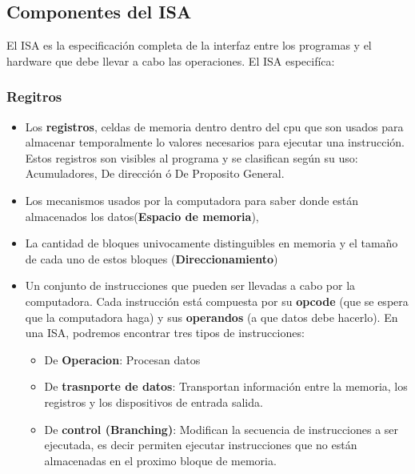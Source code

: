 \subsection{Componentes del ISA}
El ISA es la especificación completa de la interfaz entre los programas y el hardware que debe llevar a cabo las operaciones. El ISA especifíca:

\subsubsection{Regitros}
\begin{itemize}
	\item Los \textbf{registros},  celdas de memoria dentro dentro del cpu que son usados para almacenar temporalmente lo valores necesarios para ejecutar una instrucción. Estos registros son visibles al programa y se clasifican según su uso: Acumuladores, De dirección ó De Proposito General.
	\item Los mecanismos usados por la computadora para saber donde están almacenados los datos(\textbf{Espacio de memoria}), 
	\item La cantidad de bloques univocamente distinguibles en memoria y el tamaño de cada uno de estos bloques (\textbf{Direccionamiento})
	\item  Un conjunto de instrucciones  que pueden ser llevadas a cabo por la computadora. Cada instrucción está compuesta por su \textbf{opcode} (que se espera que la computadora haga) y sus \textbf{operandos} (a que datos debe hacerlo). En una ISA, podremos encontrar tres tipos de instrucciones:
	\begin{itemize}
		\item De \textbf{Operacion}: Procesan datos
		\item De \textbf{trasnporte de datos}: Transportan información entre la memoria, los registros y los dispositivos de entrada salida.
		\item De \textbf{control (Branching)}: Modifican la secuencia de instrucciones a ser ejecutada, es decir permiten ejecutar instrucciones que no están almacenadas en el proximo bloque de memoria.
	\end{itemize}
	

\end{itemize}
